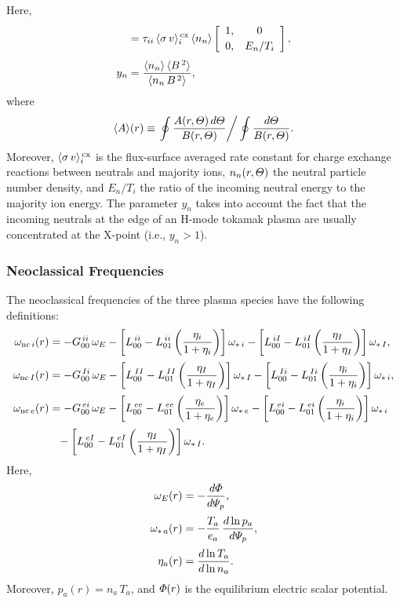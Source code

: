 \documentclass[12pt,prb,aps]{revtex4-1}
\begin{document}
Here,
\begin{align}
[Y^{\,in}] &= \tau_{ii}\,\langle \sigma\,v\rangle_i^{\,\rm cx}
\,\langle n_n\rangle\left[
\begin{array}{cc} 1,& 0\\[0.5ex]0,&E_n/T_i\end{array}
\right],\\[0.5ex]
y_n &= \frac{\langle n_n\rangle\,\langle B^{\,2}\rangle}{\langle
n_n\,B^{\,2}\rangle},
\end{align}
where
\begin{equation}
\langle A\rangle (r) \equiv\left.\oint \frac{A(r,{\mit\Theta})\,d{\mit\Theta}}{B(r,{\mit\Theta})}\right/\oint \frac{d{\mit\Theta}}{B(r,{\mit\Theta})}.
\end{equation}
Moreover, $\langle \sigma\,v\rangle_i^{\,\rm cx}$ is the flux-surface
averaged rate constant for charge exchange reactions between neutrals and majority ions, $n_n(r,{\mit\Theta})$  the
neutral particle number density, and $E_n/T_i$ the ratio of the incoming neutral energy to the majority ion energy. The parameter
$y_n$ takes into account the fact that the incoming neutrals at the
edge of an H-mode tokamak plasma are usually
concentrated at the X-point (i.e., $y_n>1$).

\subsubsection{Neoclassical Frequencies}\label{sneo}
The neoclassical frequencies of the three plasma species have the following definitions:
\begin{align}
\omega_{{\rm nc}\,i}(r)&=-G_{00}^{\,ii}\,\omega_E -\left[L^{\,ii}_{00}-L^{\,ii}_{01}\left(\frac{\eta_i}{1+\eta_i}\right)\right]\omega_{\ast\,i}-
\left[L^{\,iI}_{00}-L^{\,iI}_{01}\left(\frac{\eta_I}{1+\eta_I}\right)\right]\omega_{\ast\,I},\\[0.5ex]
\omega_{{\rm nc}\,I}(r)&=-G_{00}^{\,Ii}\,\omega_E -\left[L^{\,II}_{00}-L^{\,II}_{01}\left(\frac{\eta_I}{1+\eta_I}\right)\right]\omega_{\ast\,I}-
\left[L^{\,Ii}_{00}-L^{\,Ii}_{01}\left(\frac{\eta_i}{1+\eta_i}\right)\right]\omega_{\ast\,i},\\[0.5ex]
\omega_{{\rm nc}\,e}(r)&=-G_{00}^{\,ei}\,\omega_E -\left[L^{\,ee}_{00}-L^{\,ee}_{01}\left(\frac{\eta_e}{1+\eta_e}\right)\right]\omega_{\ast\,e}-
\left[L^{\,ei}_{00}-L^{\,ei}_{01}\left(\frac{\eta_i}{1+\eta_i}\right)\right]\omega_{\ast\,i}\nonumber\\[0.5ex]
&\phantom{=}-
\left[L^{\,eI}_{00}-L^{\,eI}_{01}\left(\frac{\eta_I}{1+\eta_I}\right)\right]\omega_{\ast\,I}.
\end{align}
Here,
\begin{align}
\omega_E(r) &=-\frac{d{\mit\Phi}}{d{\mit\Psi}_p},\\[0.5ex]
\omega_{\ast\,a}(r) &= -\frac{T_a}{e_a}\,\frac{d\ln p_a}{d{\mit\Psi}_p},\\[0.5ex]
\eta_a(r) &= \frac{d\ln T_a}{d\ln n_a}.
\end{align}
Moreover, $p_a(r)=n_a\,T_a$, and ${\mit\Phi}(r)$ is the equilibrium electric scalar potential. 
\end{document}
